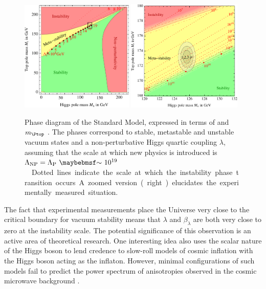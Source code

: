 \begin{figure}[t]
	\includegraphics[width=0.48\textwidth]{tex/conclusions/vacuum_stability}
	\hfill
	\includegraphics[width=0.49\textwidth]{tex/conclusions/vacuum_stability_zoom}
	\caption{Phase diagram of the Standard Model, expressed in terms of \mH and 
	$m_{\Ptop}$ \cite{Degrassi:vacuum}. The phases correspond to stable, metastable and 
	unstable vacuum states and a non-perturbative Higgs quartic coupling $\lambda$, 
	assuming that the scale at which new physics is introduced is 
	\unit{$\Lambda_{\text{NP}} = \Lambda_{\text{P}}~\about~10^{19}$}{\GeV}. Dotted lines 
	indicate the scale at which the instability phase transition occurs. A zoomed version 
	(right) elucidates the experimentally measured situation.}
	\label{fig:concl:vacuum_stability}
\end{figure}

The fact that experimental measurements place the Universe very close to the critical 
boundary for vacuum stability means that $\lambda$ and $\beta_{\lambda}$ are both very 
close to zero at the instability scale. The potential significance of this observation is 
an active area of theoretical research. One interesting idea also uses the scalar 
nature of the Higgs boson to lend credence to slow-roll models of cosmic inflation with 
the Higgs boson acting as the inflaton. However, minimal configurations of such models 
fail to predict the power spectrum of anisotropies observed in the cosmic microwave 
background \cite{Isidori:2007}.



